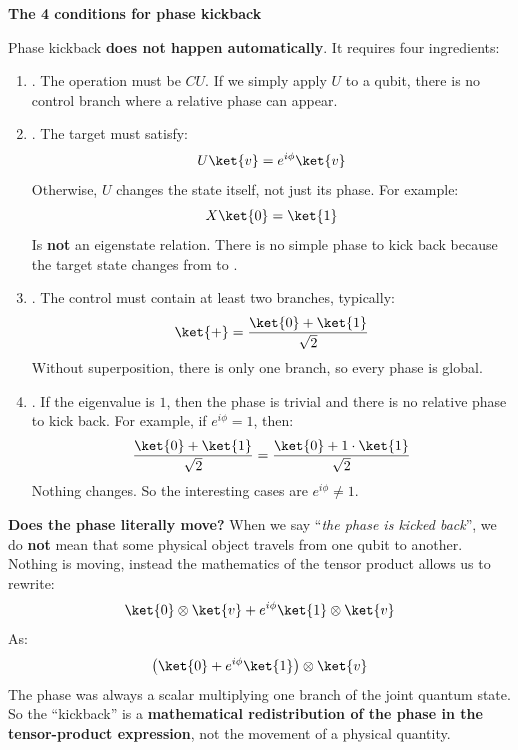 \highspace
\begin{flushleft}
    \textcolor{Red2}{ \textbf{The 4 conditions for phase kickback}}
\end{flushleft}
Phase kickback \textbf{does not happen automatically}. It requires four ingredients:
\begin{enumerate}
    \item {}. The operation must be $CU$. If we simply apply $U$ to a qubit, there is no control branch where a relative phase can appear.
    
    
    \item {}. The target must satisfy:
    \begin{equation*}
        U\ket{v} = e^{i\phi}\ket{v}
    \end{equation*}
    Otherwise, $U$ changes the state itself, not just its phase. For example:
    \begin{equation*}
        X\ket{0} = \ket{1}
    \end{equation*}
    Is \textbf{not} an eigenstate relation. There is no simple phase to kick back because the target state changes from  to .
    
    
    \item {}. The control must contain at least two branches, typically:
    \begin{equation*}
        \ket{+} = \frac{\ket{0} + \ket{1}}{\sqrt{2}}
    \end{equation*}
    Without superposition, there is only one branch, so every phase is global.
    
    
    \item {}. If the eigenvalue is $1$, then the phase is trivial and there is no relative phase to kick back. For example, if $e^{i\phi} = 1$, then:
    \begin{equation*}
        \frac{\ket{0} + \ket{1}}{\sqrt{2}} = \frac{\ket{0} + 1\cdot\ket{1}}{\sqrt{2}}
    \end{equation*}
    Nothing changes. So the interesting cases are $e^{i\phi} \neq 1$.
\end{enumerate}
\textcolor{Green3}{ \textbf{Does the phase literally move?}} When we say ``\emph{the phase is kicked back}'', we do \textbf{not} mean that some physical object travels from one qubit to another. Nothing is moving, instead the mathematics of the tensor product allows us to rewrite:
\begin{equation*}
    \ket{0} \otimes \ket{v} + e^{i\phi}\ket{1} \otimes \ket{v}
\end{equation*}
As:
\begin{equation*}
    \left(\ket{0} + e^{i\phi}\ket{1}\right) \otimes \ket{v}
\end{equation*}
The phase was always a scalar multiplying one branch of the joint quantum state. So the ``kickback'' is a \textbf{mathematical redistribution of the phase in the tensor-product expression}, not the movement of a physical quantity.